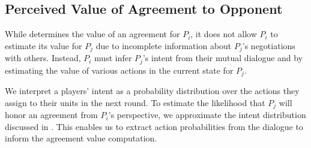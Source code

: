 %
%
%
%
%



\subsection{Perceived Value of Agreement to Opponent}

While  determines the value of an agreement for $P_i$, it does not allow $P_i$ to estimate its value for $P_j$ due to incomplete information about $P_j$'s negotiations with others. 
Instead, $P_i$ must infer $P_j$'s intent from their mutual dialogue and by estimating the value of various actions in the current state for $P_j$.



We interpret a players' intent as a probability distribution over the actions they assign to their units in the next round. 
To estimate the likelihood that $P_j$ will honor an agreement from $P_i$'s perspective, we approximate the intent distribution discussed in . 
This enables us to extract action probabilities from the dialogue to inform the agreement value computation.



